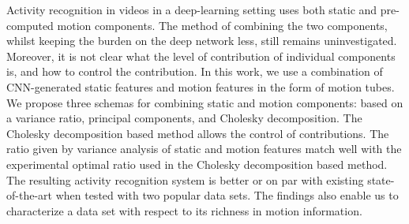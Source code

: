 Activity recognition in videos in a deep-learning setting uses both static and pre-computed motion components. The method of combining the two components, whilst keeping the burden on the deep network less, still remains uninvestigated. Moreover, it is not clear what the level of contribution of individual components is, and how to control the contribution. In this work, we use a combination of CNN-generated static features and motion features in the form of motion tubes. We propose three schemas for combining static and motion components: based on a variance ratio, principal components, and Cholesky decomposition. The Cholesky decomposition based method allows the control of contributions. The ratio given by variance analysis of static and motion features match well with the experimental optimal ratio used in the Cholesky decomposition based method. The resulting activity recognition system is better or on par with existing state-of-the-art when tested with two popular data sets. The findings also enable us to characterize a data set with respect to its richness in motion information. 